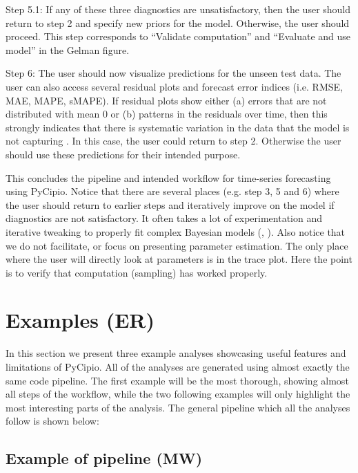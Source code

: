 \documentclass{article}
\begin{document}
\noindent Step 5.1: If any of these three diagnostics are unsatisfactory, then the user should return to step 2 and specify new priors for the model. Otherwise, the user should proceed. This step corresponds to “Validate computation” and “Evaluate and use model” in the Gelman figure.

\noindent Step 6: The user should now visualize predictions for the unseen test data. The user can also access several residual plots and forecast error indices (i.e. RMSE, MAE, MAPE, sMAPE). If residual plots show either (a) errors that are not distributed with mean 0 or (b) patterns in the residuals over time, then this strongly indicates that there is systematic variation in the data that the model is not capturing \cite{fpp3}. In this case, the user could return to step 2. Otherwise the user should use these predictions for their intended purpose. 

\noindent This concludes the pipeline and intended workflow for time-series forecasting using PyCipio. Notice that there are several places (e.g. step 3, 5 and 6) where the user should return to earlier steps and iteratively improve on the model if diagnostics are not satisfactory. It often takes a lot of experimentation and iterative tweaking to properly fit complex Bayesian models (, ). Also notice that we do not facilitate, or focus on presenting parameter estimation. The only place where the user will directly look at parameters is in the trace plot. Here the point is to verify that computation (sampling) has worked properly. 

\section{Examples (ER)}

\noindent In this section we present three example analyses showcasing useful features and limitations of PyCipio. All of the analyses are generated using almost exactly the same code pipeline. The first example will be the most thorough, showing almost all steps of the workflow, while the two following examples will only highlight the most interesting parts of the analysis. The general pipeline which all the analyses follow is shown below: 

\subsection{Example of pipeline (MW)}
\end{document}
